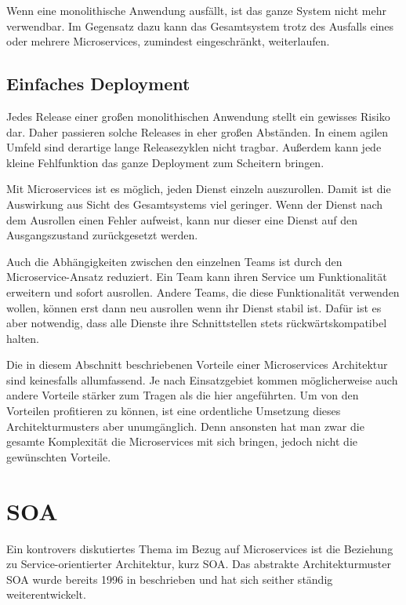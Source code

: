 Wenn eine monolithische Anwendung ausfällt, ist das ganze System nicht mehr verwendbar. Im Gegensatz dazu kann das Gesamtsystem trotz des Ausfalls eines oder mehrere Microservices, zumindest eingeschränkt, weiterlaufen.

\subsection{Einfaches Deployment}

Jedes Release einer großen monolithischen Anwendung stellt ein gewisses Risiko dar. Daher passieren solche Releases in eher großen Abständen. In einem agilen Umfeld sind derartige lange Releasezyklen nicht tragbar. Außerdem kann jede kleine Fehlfunktion das ganze Deployment zum Scheitern bringen.

Mit Microservices ist es möglich, jeden Dienst einzeln auszurollen. Damit ist die Auswirkung aus Sicht des Gesamtsystems viel geringer. Wenn der Dienst nach dem Ausrollen einen Fehler aufweist, kann nur dieser eine Dienst auf den Ausgangszustand zurückgesetzt werden.

Auch die Abhängigkeiten zwischen den einzelnen Teams ist durch den Microservice-Ansatz reduziert. Ein Team kann ihren Service um Funktionalität erweitern und sofort ausrollen. Andere Teams, die diese Funktionalität verwenden wollen, können erst dann neu ausrollen wenn ihr Dienst stabil ist. Dafür ist es aber notwendig, dass alle Dienste ihre Schnittstellen stets rückwärtskompatibel halten.

Die in diesem Abschnitt beschriebenen Vorteile einer Microservices Architektur sind keinesfalls allumfassend. Je nach Einsatzgebiet kommen möglicherweise auch andere Vorteile stärker zum Tragen als die hier angeführten. Um von den Vorteilen profitieren zu können, ist eine ordentliche Umsetzung dieses Architekturmusters aber unumgänglich. Denn ansonsten hat man zwar die gesamte Komplexität die Microservices mit sich bringen, jedoch nicht die gewünschten Vorteile.

\section{SOA}

Ein kontrovers diskutiertes Thema im Bezug auf Microservices ist die Beziehung zu Service-orientierter Architektur, kurz SOA. Das abstrakte Architekturmuster SOA wurde bereits 1996 in \cite{schulte1996service} beschrieben und hat sich seither ständig weiterentwickelt.

